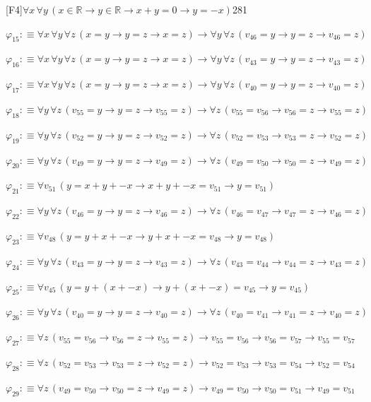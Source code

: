 \begin{fullproof}{[F4]}{$\forall x\,\forall y\,(x \in \mathbb{R} \to y \in \mathbb{R} \to x + y = 0 \to y = -x)$}{281}
\begin{abbrevlist}
\item $\varphi_{15} :\equiv \forall x\,\forall y\,\forall z\,(x = y \to y = z \to x = z) \to \forall y\,\forall z\,(v_{46} = y \to y = z \to v_{46} = z)$
\item $\varphi_{16} :\equiv \forall x\,\forall y\,\forall z\,(x = y \to y = z \to x = z) \to \forall y\,\forall z\,(v_{43} = y \to y = z \to v_{43} = z)$
\item $\varphi_{17} :\equiv \forall x\,\forall y\,\forall z\,(x = y \to y = z \to x = z) \to \forall y\,\forall z\,(v_{40} = y \to y = z \to v_{40} = z)$
\item $\varphi_{18} :\equiv \forall y\,\forall z\,(v_{55} = y \to y = z \to v_{55} = z) \to \forall z\,(v_{55} = v_{56} \to v_{56} = z \to v_{55} = z)$
\item $\varphi_{19} :\equiv \forall y\,\forall z\,(v_{52} = y \to y = z \to v_{52} = z) \to \forall z\,(v_{52} = v_{53} \to v_{53} = z \to v_{52} = z)$
\item $\varphi_{20} :\equiv \forall y\,\forall z\,(v_{49} = y \to y = z \to v_{49} = z) \to \forall z\,(v_{49} = v_{50} \to v_{50} = z \to v_{49} = z)$
\item $\varphi_{21} :\equiv \forall v_{51}\,(y = x + y + -x \to x + y + -x = v_{51} \to y = v_{51})$
\item $\varphi_{22} :\equiv \forall y\,\forall z\,(v_{46} = y \to y = z \to v_{46} = z) \to \forall z\,(v_{46} = v_{47} \to v_{47} = z \to v_{46} = z)$
\item $\varphi_{23} :\equiv \forall v_{48}\,(y = y + x + -x \to y + x + -x = v_{48} \to y = v_{48})$
\item $\varphi_{24} :\equiv \forall y\,\forall z\,(v_{43} = y \to y = z \to v_{43} = z) \to \forall z\,(v_{43} = v_{44} \to v_{44} = z \to v_{43} = z)$
\item $\varphi_{25} :\equiv \forall v_{45}\,(y = y + (x + -x) \to y + (x + -x) = v_{45} \to y = v_{45})$
\item $\varphi_{26} :\equiv \forall y\,\forall z\,(v_{40} = y \to y = z \to v_{40} = z) \to \forall z\,(v_{40} = v_{41} \to v_{41} = z \to v_{40} = z)$
\item $\varphi_{27} :\equiv \forall z\,(v_{55} = v_{56} \to v_{56} = z \to v_{55} = z) \to v_{55} = v_{56} \to v_{56} = v_{57} \to v_{55} = v_{57}$
\item $\varphi_{28} :\equiv \forall z\,(v_{52} = v_{53} \to v_{53} = z \to v_{52} = z) \to v_{52} = v_{53} \to v_{53} = v_{54} \to v_{52} = v_{54}$
\item $\varphi_{29} :\equiv \forall z\,(v_{49} = v_{50} \to v_{50} = z \to v_{49} = z) \to v_{49} = v_{50} \to v_{50} = v_{51} \to v_{49} = v_{51}$

\end{abbrevlist}
\end{fullproof}
